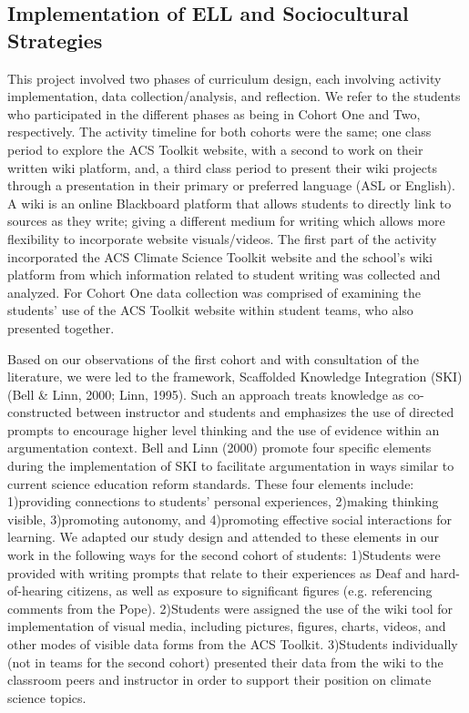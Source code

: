 \documentclass[11.5pt]{sig-alternate} %
\begin{document}
\begin{large}
\subsection*{Implementation of ELL and Sociocultural Strategies}

This project involved two phases of curriculum design, each involving activity implementation, data collection/analysis, and reflection. We refer to the students who participated in the different phases as being in Cohort One and Two, respectively. The activity timeline for both cohorts were the same; one class period to explore the ACS Toolkit website, with a second to work on their written wiki platform, and, a third class period to present their wiki projects through a presentation in their primary or preferred language (ASL or English). A wiki is an online Blackboard platform that allows students to directly link to sources as they write; giving a different medium for writing which allows more flexibility to incorporate website visuals/videos.  The first part of the activity incorporated the ACS Climate Science Toolkit website and the school’s wiki platform from which information related to student writing was collected and analyzed. For Cohort One data collection was comprised of examining the students’ use of the ACS Toolkit website within student teams, who also presented together. 

Based on our observations of the first cohort and with consultation of the literature, we were led to the framework, Scaffolded Knowledge Integration (SKI) (Bell \& Linn, 2000; Linn, 1995). Such an approach treats knowledge as co-constructed between instructor and students and emphasizes the use of directed prompts to encourage higher level thinking and the use of evidence within an argumentation context. Bell and Linn (2000) promote four specific elements during the implementation of SKI to facilitate argumentation in ways similar to current science education reform standards. These four elements include: 1)providing connections to students’ personal experiences, 2)making thinking visible, 3)promoting autonomy, and 4)promoting effective social interactions for learning. We adapted our study design and attended to these elements in our work in the following ways for the second cohort of students: 1)Students were provided with writing prompts that relate to their experiences as Deaf and hard-of-hearing citizens, as well as exposure to significant figures (e.g. referencing comments from the Pope). 2)Students were assigned the use of the wiki tool for implementation of visual media, including pictures, figures, charts, videos, and other modes of visible data forms from the ACS Toolkit. 3)Students individually (not in teams for the second cohort) presented their data from the wiki to the classroom peers and instructor in order to support their position on climate science topics. 


\end{large}
\end{document}
